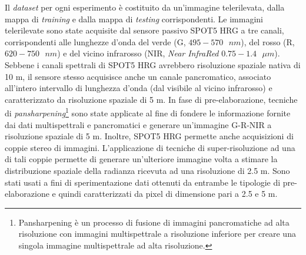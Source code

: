 Il \emph{dataset} per ogni esperimento è costituito da un'immagine telerilevata, dalla mappa di \emph{training} e dalla mappa di \emph{testing} corrispondenti.
Le immagini telerilevate sono state acquisite dal sensore passivo \textsc{SPOT5 HRG} a tre canali, corrispondenti alle lunghezze d'onda del verde (G, $495 - 570\text{ } nm$), del rosso (R, $620 -  750\text{ } nm$) e del vicino infrarosso (NIR, \emph{Near InfraRed} $0.75 - 1.4\text{ } \mu m$).
Sebbene i canali spettrali di SPOT5 HRG avrebbero risoluzione spaziale nativa di 10 m, il sensore stesso acquisisce anche un canale pancromatico, associato all'intero intervallo di lunghezza d'onda (dal visibile al vicino infrarosso) e caratterizzato da risoluzione spaziale di 5 m. In fase di pre-elaborazione, tecniche di \emph{pansharpening}\footnote{Pansharpening è un processo di fusione di immagini pancromatiche ad alta risoluzione con immagini multispettrale a risoluzione inferiore per creare una singola immagine multispettrale ad alta risoluzione.} sono state applicate al fine di fondere le informazione fornite dai dati multispettrali e pancromatici e generare un'immagine G-R-NIR a risoluzione spaziale di 5 m. Inoltre, SPOT5 HRG permette anche acquisizioni di coppie stereo di immagini. L'applicazione di tecniche di super-risoluzione ad una di tali coppie permette di generare un'ulteriore immagine volta a stimare la distribuzione spaziale della radianza ricevuta ad una risoluzione di 2.5 m. Sono stati usati a fini di sperimentazione dati ottenuti da entrambe le tipologie di pre-elaborazione e quindi caratterizzati da pixel di dimensione pari a 2.5 e 5 m.
 

